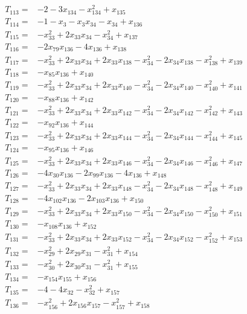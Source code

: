 \begin{align*}
T_{113}={}&-2-3x_{134}-x_{134}^{2}+x_{135}\\[3pt]
T_{114}={}&-1-x_{3}-x_{3}x_{34}-x_{34}+x_{136}\\[3pt]
T_{115}={}&-x_{33}^{2}+2x_{33}x_{34}-x_{34}^{2}+x_{137}\\[3pt]
T_{116}={}&-2x_{79}x_{136}-4x_{136}+x_{138}\\[3pt]
T_{117}={}&-x_{33}^{2}+2x_{33}x_{34}+2x_{33}x_{138}-x_{34}^{2}-2x_{34}x_{138}-x_{138}^{2}+x_{139}\\[3pt]
T_{118}={}&-x_{85}x_{136}+x_{140}\\[3pt]
T_{119}={}&-x_{33}^{2}+2x_{33}x_{34}+2x_{33}x_{140}-x_{34}^{2}-2x_{34}x_{140}-x_{140}^{2}+x_{141}\\[3pt]
T_{120}={}&-x_{88}x_{136}+x_{142}\\[3pt]
T_{121}={}&-x_{33}^{2}+2x_{33}x_{34}+2x_{33}x_{142}-x_{34}^{2}-2x_{34}x_{142}-x_{142}^{2}+x_{143}\\[3pt]
T_{122}={}&-x_{92}x_{136}+x_{144}\\[3pt]
T_{123}={}&-x_{33}^{2}+2x_{33}x_{34}+2x_{33}x_{144}-x_{34}^{2}-2x_{34}x_{144}-x_{144}^{2}+x_{145}\\[3pt]
T_{124}={}&-x_{95}x_{136}+x_{146}\\[3pt]
T_{125}={}&-x_{33}^{2}+2x_{33}x_{34}+2x_{33}x_{146}-x_{34}^{2}-2x_{34}x_{146}-x_{146}^{2}+x_{147}\\[3pt]
T_{126}={}&-4x_{30}x_{136}-2x_{99}x_{136}-4x_{136}+x_{148}\\[3pt]
T_{127}={}&-x_{33}^{2}+2x_{33}x_{34}+2x_{33}x_{148}-x_{34}^{2}-2x_{34}x_{148}-x_{148}^{2}+x_{149}\\[3pt]
T_{128}={}&-4x_{102}x_{136}-2x_{103}x_{136}+x_{150}\\[3pt]
T_{129}={}&-x_{33}^{2}+2x_{33}x_{34}+2x_{33}x_{150}-x_{34}^{2}-2x_{34}x_{150}-x_{150}^{2}+x_{151}\\[3pt]
T_{130}={}&-x_{108}x_{136}+x_{152}\\[3pt]
T_{131}={}&-x_{33}^{2}+2x_{33}x_{34}+2x_{33}x_{152}-x_{34}^{2}-2x_{34}x_{152}-x_{152}^{2}+x_{153}\\[3pt]
T_{132}={}&-x_{29}^{2}+2x_{29}x_{31}-x_{31}^{2}+x_{154}\\[3pt]
T_{133}={}&-x_{30}^{2}+2x_{30}x_{31}-x_{31}^{2}+x_{155}\\[3pt]
T_{134}={}&-x_{154}x_{155}+x_{156}\\[3pt]
T_{135}={}&-4-4x_{32}-x_{32}^{2}+x_{157}\\[3pt]
T_{136}={}&-x_{156}^{2}+2x_{156}x_{157}-x_{157}^{2}+x_{158}\\[3pt]

\end{align*}
